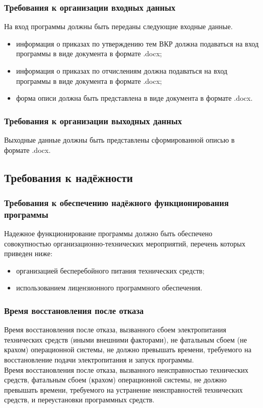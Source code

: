 \documentclass[14pt, a4paper]{extarticle}
\begin{document}
	\subsubsection{Требования к организации входных данных}
	На вход программы должны быть переданы следующие входные данные.
	\begin{itemize}
		\item информация о приказах по утверждению тем ВКР должна подаваться на вход программы в виде документа в формате .docx;
		\item информация о приказах по отчислениям должна подаваться на вход программы в виде документа в формате .docx;
		\item форма описи должна быть представлена в виде документа в формате .docx.
	\end{itemize}
	
	\subsubsection{Требования к организации выходных данных}
	Выходные данные должны быть представлены сформированной описью в формате .docx.
	
	\subsection{Требования к надёжности}
	\subsubsection{Требования к обеспечению надёжного функционирования программы}
	Надежное функционирование программы должно быть обеспечено совокупностью организационно-технических мероприятий, перечень которых приведен ниже:
	\begin{itemize}
		\item организацией бесперебойного питания технических средств;
		\item использованием лицензионного программного обеспечения.
	\end{itemize}
	
	\subsubsection{Время восстановления после отказа}
	Время восстановления после отказа, вызванного сбоем электропитания технических средств (иными внешними факторами), не фатальным сбоем (не крахом) операционной системы, не должно превышать времени, требуемого на восстановление подачи электропитания и запуск программы.\\
	Время восстановления после отказа, вызванного неисправностью технических средств, фатальным сбоем (крахом) операционной системы, не должно превышать времени, требуемого на устранение неисправностей технических средств, и переустановки программных средств.
	
\end{document}

